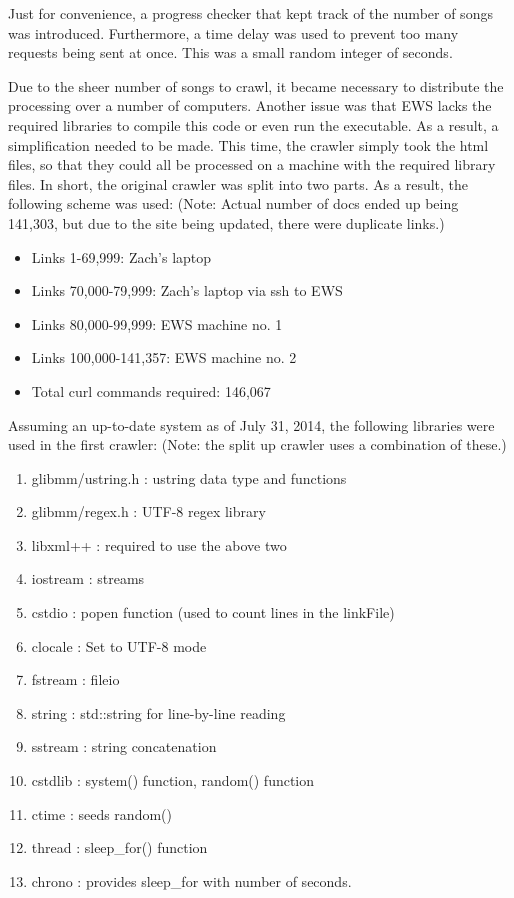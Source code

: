 \documentclass{acm} %
\begin{document}
\begin{CJK}{UTF8}{zhsong}
Just for convenience, a progress checker that kept track of the number of songs was introduced. Furthermore, a time delay was used to prevent too many requests being sent at once. This was a small random integer of seconds.

Due to the sheer number of songs to crawl, it became necessary to distribute the processing over a number of computers. Another issue was that EWS lacks the required libraries to compile this code or even run the executable. As a result, a simplification needed to be made. This time, the crawler simply took the html files, so that they could all be processed on a machine with the required library files. In short, the original crawler was split into two parts. As a result, the following scheme was used: (Note: Actual number of docs ended up being 141,303, but due to the site being updated, there were duplicate links.)

\begin{itemize}
 \item Links 1-69,999: Zach's laptop
 \item Links 70,000-79,999: Zach's laptop via ssh to EWS
 \item Links 80,000-99,999: EWS machine no. 1
 \item Links 100,000-141,357: EWS machine no. 2
 \item Total curl commands required: 146,067
\end{itemize}

Assuming an up-to-date system as of July 31, 2014, the following libraries were used in the first crawler: (Note: the split up crawler uses a combination of these.)

\begin{enumerate}
 \item glibmm/ustring.h : ustring data type and functions
 \item glibmm/regex.h : UTF-8 regex library
 \item libxml++ : required to use the above two
 \item iostream : streams
 \item cstdio : popen function (used to count lines in the linkFile)
 \item clocale : Set to UTF-8 mode
 \item fstream : fileio
 \item string : std::string for line-by-line reading
 \item sstream : string concatenation
 \item cstdlib : system() function, random() function
 \item ctime : seeds random()
 \item thread : sleep\_for() function
 \item chrono : provides sleep\_for with number of seconds.
\end{enumerate}


\end{CJK}
\end{document}
